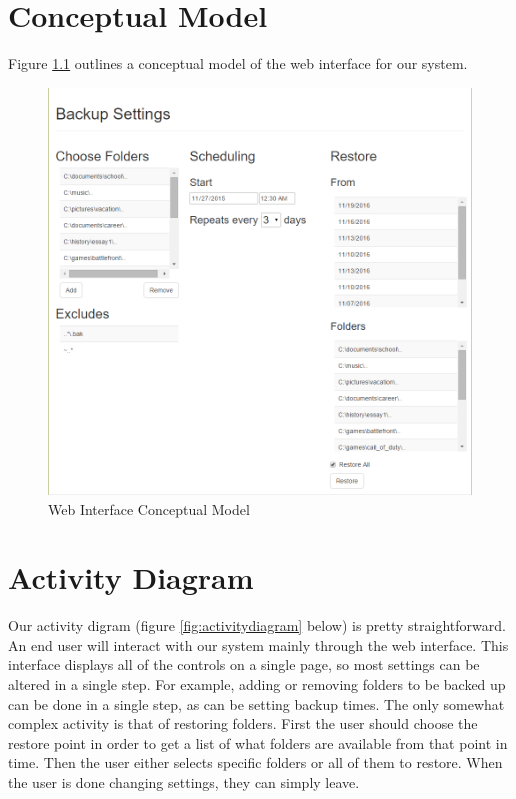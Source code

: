 \chapter{Conceptual Model}

Figure \ref{fig:mockup} outlines a conceptual model of the web interface for our system.

\begin{figure}[h]
	\centering
\includegraphics[scale=0.45]{images/mockup.png}
	\caption{Web Interface Conceptual Model}
	\label{fig:mockup}
\end{figure}

\chapter{Activity Diagram}

Our activity digram (figure \ref{fig:activitydiagram} below) is pretty straightforward.  An end user will interact with our system mainly through the web interface.  This interface displays all of the controls on a single page, so most settings can be altered in a single step.  For example, adding or removing folders to be backed up can be done in a single step, as can be setting backup times.  The only somewhat complex activity is that of restoring folders.  First the user should choose the restore point in order to get a list of what folders are available from that point in time.  Then the user either selects specific folders or all of them to restore.  When the user is done changing settings, they can simply leave.

